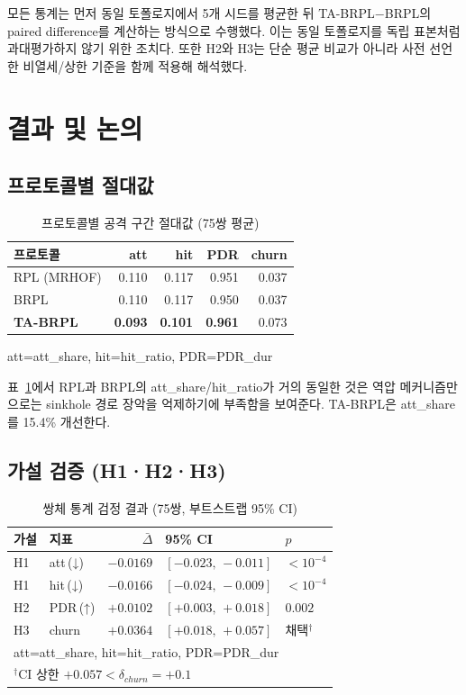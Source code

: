 \documentclass[10pt,a4paper,twocolumn]{article}
\begin{document}
모든 통계는 먼저 동일 토폴로지에서 5개 시드를 평균한 뒤
TA-BRPL$-$BRPL의 paired difference를 계산하는 방식으로 수행했다.
이는 동일 토폴로지를 독립 표본처럼 과대평가하지 않기 위한 조치다.
또한 H2와 H3는 단순 평균 비교가 아니라
사전 선언한 비열세/상한 기준을 함께 적용해 해석했다.


\section{결과 및 논의}
\label{sec:results}

\subsection{프로토콜별 절대값}

\begin{table}[t]
\centering\small
\caption{프로토콜별 공격 구간 절대값 (75쌍 평균)}
\label{tab:absolute}
\begin{tabular}{lrrrr}
\toprule
프로토콜 & att & hit & PDR & churn \\
\midrule
RPL (MRHOF)       & 0.110 & 0.117 & 0.951 & 0.037 \\
BRPL              & 0.110 & 0.117 & 0.950 & 0.037 \\
\textbf{TA-BRPL}  & \textbf{0.093} & \textbf{0.101}
                  & \textbf{0.961} & 0.073 \\
\bottomrule
\end{tabular}
{\footnotesize att=att\_share, hit=hit\_ratio, PDR=PDR\_dur}
\end{table}

표~\ref{tab:absolute}에서 RPL과 BRPL의 att\_share/hit\_ratio가 거의 동일한 것은
역압 메커니즘만으로는 sinkhole 경로 장악을 억제하기에 부족함을 보여준다.
TA-BRPL은 att\_share를 15.4\% 개선한다.

\subsection{가설 검증 (H1·H2·H3)}

\begin{table}[t]
\centering\small
\caption{쌍체 통계 검정 결과 (75쌍, 부트스트랩 95\% CI)}
\label{tab:stats}
\begin{tabular}{llrll}
\toprule
가설 & 지표 & $\bar\Delta$ & 95\% CI & $p$ \\
\midrule
H1 & att\,(↓) & $-0.0169$ & $[-0.023,\,-0.011]$ & $<10^{-4}$ \\
H1 & hit\,(↓) & $-0.0166$ & $[-0.024,\,-0.009]$ & $<10^{-4}$ \\
H2 & PDR\,(↑) & $+0.0102$ & $[+0.003,\,+0.018]$ & $0.002$ \\
H3 & churn     & $+0.0364$ & $[+0.018,\,+0.057]$ & 채택$^\dagger$ \\
\bottomrule
\multicolumn{5}{l}{\footnotesize att=att\_share, hit=hit\_ratio, PDR=PDR\_dur}\\
\multicolumn{5}{l}{\footnotesize $^\dagger$CI 상한 $+0.057<\delta_{churn}{=}+0.1$}
\end{tabular}
\end{table}
\end{document}
